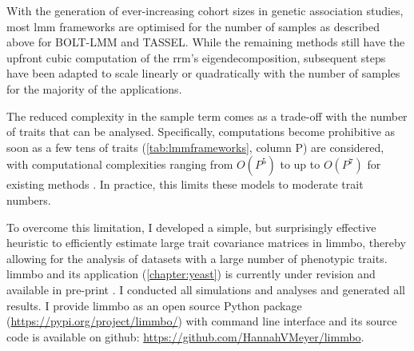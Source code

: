With the generation of ever-increasing cohort sizes in genetic association studies, most \gls{lmm} frameworks are optimised for the number of samples as described above for BOLT-LMM and TASSEL. While the remaining methods still have the upfront cubic computation of the  \gls{rrm}'s eigendecomposition, subsequent steps have been adapted to scale linearly or quadratically with the number of samples for the majority of the applications.

The reduced complexity in the sample term comes as a trade-off with the number of traits that can be analysed. 
Specifically, computations become prohibitive as soon as a few tens of traits  (\cref{tab:lmmframeworks}, column P) are considered, with computational complexities ranging from \(O(P^5)\) to up to \(O(P^7)\) for existing methods \citep{Casale2015,Korte2012}. In practice, this limits these models to moderate trait numbers.

To overcome this limitation, I developed a simple, but surprisingly effective heuristic to efficiently estimate large trait covariance matrices in \gls{limmbo}, thereby allowing for the analysis of datasets with a large number of phenotypic traits. \gls{limmbo} and its application (\cref{chapter:yeast}) is currently under revision and available in pre-print \citep{Meyer2018a}. 
I conducted all simulations and analyses and generated all results. I provide \gls{limmbo} as an open source Python package (\url{https://pypi.org/project/limmbo/}) with command line interface and its source code is available on github: \url{https://github.com/HannahVMeyer/limmbo}.

